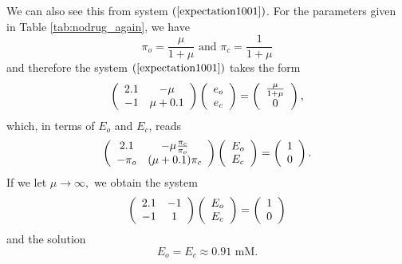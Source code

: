 We can also see this from system $\left(  \ref{expectation1001}\right)  $. For the parameters given
in Table \ref{tab:nodrug_again}, we have
\[ \pi_{o}=\frac{\mu}{1+\mu}  \text{ and }  \pi_{c}=\frac{1}{1+\mu}\]
and therefore the 
system $\left(  \ref{expectation1001}\right) $ takes the form%
\begin{equation}
\left(
\begin{array}
[c]{cc}%
2.1 & -\mu\\
-1 & \mu+0.1
\end{array}
\right)  \left(
\begin{array}
[c]{c}%
e_{o}\\
e_{c}%
\end{array}
\right)  =\left(
\begin{array}
[c]{c}%
\frac{\mu}{1+\mu}\\
0
\end{array}
\right)  ,
\end{equation}
which, in terms of $E_{o}$ and $E_{c}$, reads%
\begin{equation}
\left(
\begin{array}
[c]{cc}%
2.1 & -\mu \frac{\pi_c}{\pi_o}\\
-\pi_o & (\mu+0.1)\pi_c%
\end{array}
\right)  \left(
\begin{array}
[c]{c}%
E_{o}\\
E_{c}%
\end{array}
\right)  =\left(
\begin{array}
[c]{c}%
1\\
0
\end{array}
\right)  .
\end{equation}
If we let $\mu\longrightarrow\infty,$ we obtain the system%
\begin{equation}
\left(
\begin{array}
[c]{cc}%
2.1 & -1\\
-1 & 1
\end{array}
\right)  \left(
\begin{array}
[c]{c}%
E_{o}\\
E_{c}%
\end{array}
\right)  =\left(
\begin{array}
[c]{c}%
1\\
0
\end{array}
\right)  
\end{equation}
and the solution%
\[
E_{o}=E_{c}\approx 0.91 \text{ mM}.
\]

